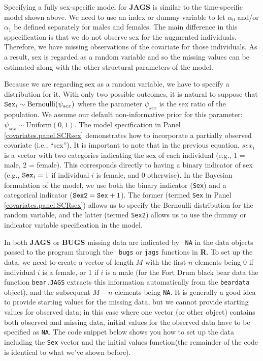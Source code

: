 Specifying a fully sex-specific model for {\bf JAGS} is similar to the
time-specific model shown above. We need to use an index or dummy
variable to let $\alpha_0$ and/or $\alpha_1$ be defined separately for
males and females. The main difference in this sppecification is that we do
not observe sex for the augmented individuals. Therefore, we have
missing observations of the covariate for those individuals. As a
result, sex is regarded as a random variable and so the missing values
can be estimated along with the other structural parameters of the
model.    

Because we are regarding sex as a random variable, 
we have to specify a distribution for it.  
With only two possible outcomes, it is natural to suppose that
$\mbox{\tt Sex}_{i} \sim
\mbox{Bernoulli}(\psi_{sex})$ where the parameter $\psi_{sex}$ is the sex ratio of the
population.  
We assume our default non-informative prior for this parameter:
$\psi_{sex} \sim \mbox{Uniform}(0,1)$.  The model
specification in Panel \ref{covariates.panel.SCRsex} demonstrates how
to incorporate a partially observed covariate (i.e., ``sex'').
It is important to note that in the previous equation,
$sex_{i}$ is a vector with two categories indicating the sex of
each individual (e.g., 1 = male, 2 = female).  This corresponds
directly to having a binary indicator of sex 
(e.g., $\mbox{\tt Sex}_{i} = 1$ if individual $i$ is female, and 0 otherwise).
In the Bayesian formulation of the model, we use 
both the binary indicator ({\tt Sex}) and a categorical
indicator ($\mbox{\tt Sex2} = \mbox{\tt Sex} + 1$).  The former (termed {\tt Sex} in 
Panel \ref{covariates.panel.SCRsex}) allows us to specify the \mbox{Bernoulli} 
distribution for the random variable, and the latter (termed {\tt Sex2}) allows
us to use the dummy or indicator variable specification in the model.


In both {\bf JAGS} or {\bf BUGS} missing data are indicated by  {\tt
  NA} in the data objects passed to the program through the \mbox{\tt
  bugs} or \mbox{\tt jags} functions in {\bf R}. To set up the data,
we need to create a 
vector of length $M$ with the first $n$ elements being 0 if individual
$i$ is a female, or 1 if $i$ is a male (for the Fort Drum black bear
data the function {\tt bear.JAGS} extracts this information
automatically from the {\tt beardata} object), and the subsequent
$M-n$ elements being {\tt NA}.  It is generally a good idea to provide
starting values for the missing data, but we cannot provide starting
values for observed data; in this case where one vector (or other
object) contains both observed and missing data, initial values for
the observed data have to be specified as {\tt NA}.  The code snippet
below shows you how to set up the data including the {\tt Sex} vector
and the initial values function(the remainder of the code is identical to what we've
shown before).  

